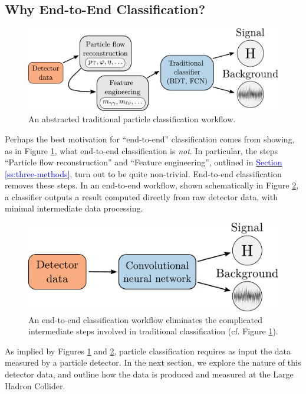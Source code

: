 \documentclass[11pt, a4paper]{article}
\newcommand{\myhref}[2]{\hyperref[#1]{\textcolor{blue}{#2}}}
\begin{document}
\subsection{Why End-to-End Classification?}

\begin{figure}[htb!]
        \centering
        \includegraphics[width=0.8\linewidth]{vector/traditional-pipeline.pdf}
        \caption{An abstracted traditional particle classification workflow.}
        \label{fig:traditional-pipeline}
\end{figure}

Perhaps the best motivation for ``end-to-end'' classification comes from showing, as in Figure \ref{fig:traditional-pipeline}, what end-to-end classification is \textit{not}.
In particular, the steps ``Particle flow reconstruction'' and ``Feature engineering'', outlined in \myhref{ss:three-methods}{Section \ref{ss:three-methods}}, turn out to be quite non-trivial.
End-to-end classification removes these steps.
In an end-to-end workflow, shown schematically in Figure \ref{fig:cnn-pipeline}, a classifier outputs a result computed directly from raw detector data, with minimal intermediate data processing.

\begin{figure}[htb!]
    \centering
    \includegraphics[width=0.70\linewidth]{vector/cnn-pipeline.pdf}
    \caption{An end-to-end classification workflow eliminates the complicated intermediate steps involved in traditional classification (cf. Figure \ref{fig:traditional-pipeline}).}
    \label{fig:cnn-pipeline}
\end{figure}

 As implied by Figures \ref{fig:traditional-pipeline} and \ref{fig:cnn-pipeline}, particle classification requires as input the data measured by a particle detector.
 In the next section, we explore the nature of this detector data, and outline how the data is produced and measured at the Large Hadron Collider.
\end{document}
